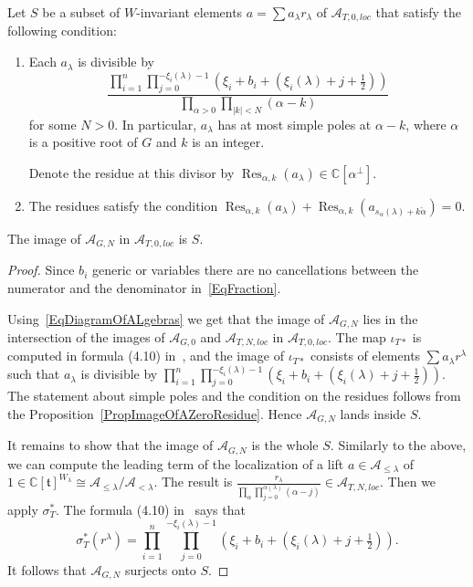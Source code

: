 \documentclass{article}
\renewcommand{\C}{\mathbb{C}}
\newcommand{\mf}{\mathfrak}
\newcommand{\mc}[1]{\mathcal{#1}}
\newcommand{\Res}{\operatorname{Res}}
\newcommand{\abs}[1]{\lvert #1\rvert}
\begin{document}
 Let $S$ be a subset of $W$-invariant elements $a=\sum a_{\lambda} r_{\lambda}$ of $\mc{A}_{T,0,loc}$ that satisfy the following condition: 
\begin{enumerate}
\item
Each $a_{\lambda}$ is divisible by 
\begin{equation}
\label{EqFraction}
\frac{\prod_{i=1}^n \prod_{j=0}^{-\xi_i(\lambda)-1}(\xi_i+b_i+(\xi_i(\lambda)+j+\tfrac12))}{\prod_{\alpha>0}\prod_{\abs{k}<N}(\alpha-k)}
\end{equation} 
for some $N>0$. In particular, $a_{\lambda}$ has at most simple poles at $\alpha-k$, where $\alpha$ is a positive root of $G$ and $k$ is an integer. 

Denote the residue at this divisor by $\Res_{\alpha,k}(a_{\lambda})\in \C[\alpha^{\perp}]$.
\item
The residues satisfy the condition $\Res_{\alpha,k}(a_{\lambda})+\Res_{\alpha,k}(a_{s_{\alpha}(\lambda)+k\check{\alpha}})=0$.
\end{enumerate}
\begin{thr}
\label{ThrAnswer}
The image of $\mc{A}_{G,N}$ in $\mc{A}_{T,0,loc}$ is $S$.
\end{thr}
\begin{proof}
Since $b_i$ generic or variables there are no cancellations between the numerator and the denominator in~\eqref{EqFraction}.

Using~\eqref{EqDiagramOfALgebras} we get that the image of $\mc{A}_{G,N}$ lies in the intersection of the images of $\mc{A}_{G,0}$ and $\mc{A}_{T,N,loc}$ in $\mc{A}_{T,0,loc}$. The map $\iota_{T*}$ is computed in formula (4.10) in~\cite{BFN}, and the image of $\iota_{T*}$ consists of elements $\sum a_{\lambda} r^{\lambda}$ such that $a_{\lambda}$ is divisible by $\prod_{i=1}^n \prod_{j=0}^{-\xi_i(\lambda)-1}(\xi_i+b_i+(\xi_i(\lambda)+j+\tfrac12))$. The statement about simple poles and the condition on the residues follows from the Proposition~\ref{PropImageOfAZeroResidue}. Hence $\mc{A}_{G,N}$ lands inside $S$.

It remains to show that the image of $\mc{A}_{G,N}$ is the whole $S$. Similarly to the above, we can compute the leading term of the localization of a lift $a\in\mc{A}_{\leq \lambda}$ of $1\in\C[\mf{t}]^{W_{\lambda}}\cong \mc{A}_{\leq \lambda}/\mc{A}_{<\lambda}$. The result is $\frac{r_{\lambda}}{\prod_{\alpha}\prod_{j=0}^{\alpha(\lambda)}(\alpha-j)}\in \mc{A}_{T,N,loc}$. Then we apply $\sigma_T^*$. The formula (4.10) in~\cite{BFN} says that \[\sigma_T^*(r^{\lambda})=\prod_{i=1}^n \prod_{j=0}^{-\xi_i(\lambda)-1}(\xi_i+b_i+(\xi_i(\lambda)+j+\tfrac12)).\] It follows that $\mc{A}_{G,N}$ surjects onto $S$. 
\end{proof}
\end{document}
